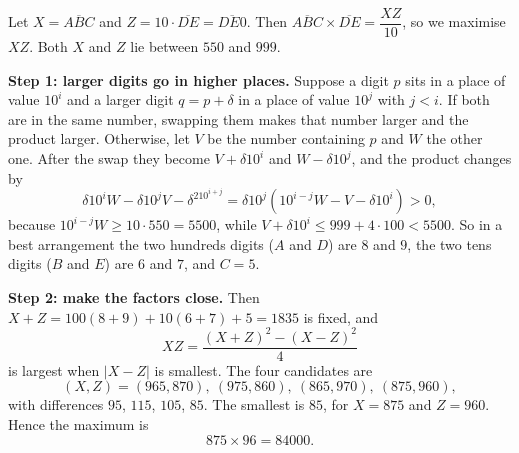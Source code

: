 Let $X=\overline{ABC}$ and $Z=10\cdot\overline{DE}=\overline{DE0}$. Then $\overline{ABC}\times\overline{DE}=\dfrac{XZ}{10}$, so we maximise $XZ$. Both $X$ and $Z$ lie between $550$ and $999$.

\textbf{Step 1: larger digits go in higher places.} Suppose a digit $p$ sits in a place of value $10^i$ and a larger digit $q=p+\delta$ in a place of value $10^j$ with $j<i$. If both are in the same number, swapping them makes that number larger and the product larger. Otherwise, let $V$ be the number containing $p$ and $W$ the other one. After the swap they become $V+\delta10^i$ and $W-\delta10^j$, and the product changes by
\[\delta10^iW-\delta10^jV-\delta^210^{i+j}=\delta10^j\left(10^{i-j}W-V-\delta10^i\right)>0,\]
because $10^{i-j}W\ge10\cdot550=5500$, while $V+\delta10^i\le999+4\cdot100<5500$. So in a best arrangement the two hundreds digits ($A$ and $D$) are $8$ and $9$, the two tens digits ($B$ and $E$) are $6$ and $7$, and $C=5$.

\textbf{Step 2: make the factors close.} Then $X+Z=100(8+9)+10(6+7)+5=1835$ is fixed, and
\[XZ=\dfrac{(X+Z)^2-(X-Z)^2}{4}\]
is largest when $|X-Z|$ is smallest. The four candidates are
\[(X,Z)=(965,870),\ (975,860),\ (865,970),\ (875,960),\]
with differences $95$, $115$, $105$, $85$. The smallest is $85$, for $X=875$ and $Z=960$. Hence the maximum is
\[875\times96=\boxed{84000}.\]
